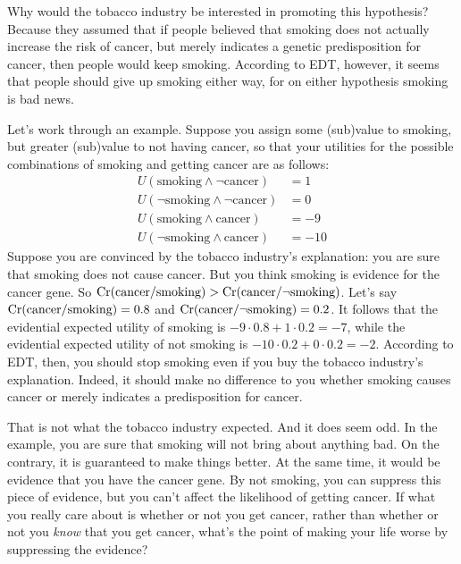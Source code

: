 Why would the tobacco industry be interested in promoting this
hypothesis? Because they assumed that if people believed that smoking
does not actually increase the risk of cancer, but merely indicates a
genetic predisposition for cancer, then people would keep smoking.
According to EDT, however, it seems that people should give up smoking
either way, for on either hypothesis smoking is bad news.

Let's work through an example. Suppose you assign some (sub)value to
smoking, but greater (sub)value to not having cancer, so that your
utilities for the possible combinations of smoking and getting cancer
are as follows:
%
\begin{align*}
U(\text{smoking} \land \neg\text{cancer}) &= 1\\
U(\neg \text{smoking} \land \neg\text{cancer}) &= 0\\
U(\text{smoking} \land \text{cancer}) &= -9\\
U(\neg\text{smoking} \land \text{cancer}) &= -10
\end{align*}
Suppose you are convinced by the tobacco industry's explanation: you
are sure that smoking does not cause cancer. But you think
smoking is evidence for the cancer gene. So
$\text{Cr}(\text{cancer}/\text{smoking}) > \text{Cr}(\text{cancer}/\neg
\text{smoking})$. Let's say $\text{Cr}(\text{cancer}/\text{smoking}) = 0.8$
and $\text{Cr}(\text{cancer}/\neg\text{smoking}) = 0.2$. It follows that the
evidential expected utility of smoking is $-9 \cdot 0.8 + 1 \cdot 0.2
= -7$, while the evidential expected utility of not smoking is $-10
\cdot 0.2 + 0 \cdot 0.2 = -2$.  According to EDT, then, you should
stop smoking even if you buy the tobacco industry's
explanation. Indeed, it should make no difference to you whether
smoking causes cancer or merely indicates a predisposition for cancer.

That is not what the tobacco industry expected. And it does seem
odd. In the example, you are sure that smoking will not bring about
anything bad. On the contrary, it is guaranteed to make things
better. At the same time, it would be evidence that you have the
cancer gene. By not smoking, you can suppress this piece of evidence,
but you can't affect the likelihood of getting cancer. If what you
really care about is whether or not you get cancer, rather than
whether or not you \emph{know} that you get cancer, what's the point
of making your life worse by suppressing the evidence?

